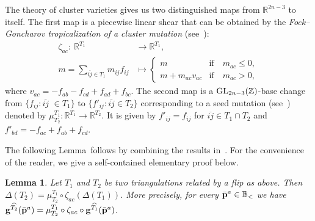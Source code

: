 \documentclass[10pt,a4paper]{amsart}
\newcommand{\thlabel}[1]{\label{#1}}
\newtheorem{Lemma}[Theorem]{Lemma}
\numberwithin{equation}{section}
\begin{document}
The theory of cluster varieties gives us two distinguished maps from $\mathbb R^{2n-3} $ to itself. The first map is a piecewise linear shear that can be obtained by the {\it Fock--Goncharov tropicalization of a cluster mutation} (see~\cite[Definition~1.22]{GHKK}):\vspace{-.5ex}
\begin{align*}%
 \zeta_{ac}\colon\ \mathbb R^{T_1} &\to \mathbb R^{T_1},
 \\
 m=\sum_{\overline{ij}\in T_1} m_{ij}f_{ij} &\mapsto
 \begin{cases}
 m & \text{if}\quad m_{ac}\le 0,\\
 m+m_{ac}v_{ac} & \text{if}\quad m_{ac}>0,
 \end{cases}
\end{align*}
where $v_{ac}=-f_{ab}-f_{cd}+f_{ad}+f_{bc}$.
The second map is a ${\rm GL}_{2n-3}(\mathbb Z)$-base change from $\{f_{ij}\colon \overline{ij}$ $\in T_1\}$ to $\{f'_{ij}\colon \overline{ij}\in T_2\}$ corresponding to a seed mutation (see~\cite[equation~(8)]{FG_ensem}) denoted by $\mu^{T_1}_{T_2}\colon \mathbb R^{T_1} \to \mathbb R^{T_2}$.
It is given by $f'_{ij}=f_{ij}$ for $\overline{ij}\in T_1\cap T_2$ and $f'_{bd}=-f_{ac}+f_{ab}+f_{cd}$.

The following Lemma~follows by combining the results in~\cite[Sections~1.3 and~5]{GHKK}.
For the convenience of the reader, we give a self-contained elementary proof below.
\begin{Lemma}\thlabel{lem:mutate NObodies}
Let $T_1$ and $T_2$ be two triangulations related by a flip as above.
Then $\Delta(T_2) = \mu^{T_1}_{T_2} \circ \zeta_{ac} (\Delta(T_1))$. More precisely, for every $\bar{\bf p}^a\in \mathbb B_{<}$ we have
${\bf g}^{\widehat{T_2}}(\bar {\bf p}^a) = \mu^{T_1}_{T_2} \circ \zeta_{ac} \circ {\bf g}^{\widehat{T_1}}(\bar {\bf p}^a)$.
\end{Lemma}
\end{document}
